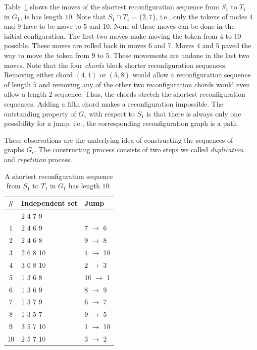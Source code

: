 \documentclass{article}
\begin{document}
Table~\ref{tab:recon1} shows the moves of the shortest reconfiguration
sequence from $S_1$ to $T_1$ in $G_1$, is has length $10$. Note that
$S_1 \cap T_1=\{2,7\}$, i.e., only the tokens of nodes $4$ and $9$
have to be move to $5$ and $10$. None of these moves can be done in
the initial configuration. The first two moves make moving the token
from $4$ to $10$ possible. These moves are rolled back in moves 6 and
7. Moves $4$ and $5$ paved the way to move the token from $9$ to $5$.
These movements are undone in the last two moves. Note that the four
{\em chords} block shorter reconfiguration sequences. Removing either
chord $(4,1)$ or $(5,8)$ would allow a reconfiguration sequence of
length $5$ and removing any of the other two reconfiguration chords
would even allow a length $2$ sequence. Thus, the chords stretch the
shortest reconfiguration sequences. Adding a fifth chord makes a
reconfiguration impossible. The outstanding property of $G_1$ with
respect to $S_1$ is that there is always only one possibility for a
jump, i.e., the corresponding reconfiguration graph is a path.

These observations are the underlying idea of constructing the
sequences of graphs $G_c$. The constructing process consists of two
steps we called {\em duplication} and {\em repetition} process.

\begin{table}[ht]
\centering
\begin{tabular}[t]{c|ll}
\toprule
\#&Independent set & Jump\\
\midrule
&2 4 7 9&\\
1&2 4 6 9& 7 $\rightarrow$ 6\\
2&2 4 6 8& 9 $\rightarrow$ 8\\
3&2 6 8 10& 4 $\rightarrow$ 10\\
4&3 6 8 10& 2 $\rightarrow$ 3\\
5&1 3 6 8& 10 $\rightarrow$ 1\\
6&1 3 6 9& 8 $\rightarrow$ 9\\
7&1 3 7 9& 6 $\rightarrow$ 7\\
8&1 3 5 7& 9 $\rightarrow$ 5\\
9&3 5 7 10& 1 $\rightarrow$ 10\\
10&2 5 7 10& 3 $\rightarrow$ 2\\
\bottomrule
\end{tabular}
\caption{A shortest reconfiguration sequence from $S_1$ to $T_1$ in
  $G_1$ has length $10$.}\label{tab:recon1}
\end{table}%
\end{document}

